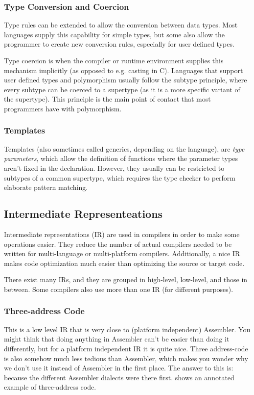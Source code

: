 \documentclass{article}
\begin{document}
\subsubsection{Type Conversion and Coercion}
Type rules can be extended to allow the conversion between data types.
Most languages supply this capability for simple types, but some also allow the programmer to create new conversion rules, especially for user defined types.

Type coercion is when the compiler or runtime environment supplies this mechanism implicitly (as opposed to e.g. casting in C).
Languages that support user defined types and polymorphism usually follow the subtype principle, where every subtype can be coerced to a supertype (as it is a more specific variant of the supertype).
This principle is the main point of contact that most programmers have with polymorphism.

\subsubsection{Templates}
Templates (also sometimes called generics, depending on the language), are \emph{type parameters}, which allow the definition of functions where the parameter types aren't fixed in the declaration.
However, they usually can be restricted to subtypes of a common supertype, which requires the type checker to perform elaborate pattern matching.

\subsection{Intermediate Representeations}
Intermediate representations (IR) are used in compilers in order to make some operations easier.
They reduce the number of actual compilers needed to be written for multi-language or multi-platform compilers.
Additionally, a nice IR makes code optimization much easier than optimizing the source or target code.

There exist many IRs, and they are grouped in high-level, low-level, and those in between.
Some compilers also use more than one IR (for different purposes).

\subsubsection{Three-address Code}
This is a low level IR that is very close to (platform independent) Assembler.
You might think that doing anything in Assembler can't be easier than doing it differently, but for a platform independent IR it is quite nice.
Three address-code is also somehow much less tedious than Assembler, which makes you wonder why we don't use it instead of Assembler in the first place.
The answer to this is: because the different Assembler dialects were there first.
 shows an annotated example of three-address code.
\end{document}
